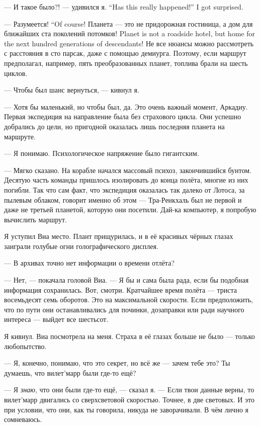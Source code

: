 {--- И такое было?! --- удивился я.}
{``Has this really happened!'' I got surprised.}

{--- Разумеется!}
{``Of course!}
{Планета --- это не придорожная гостиница, а дом для ближайших ста поколений потомков!}
{Planet is not a roadside hotel, but home for the next hundred generations of descendants!}
Не все нюансы можно рассмотреть с расстояния в сто парсак, даже с помощью демиурга.
Поэтому, если маршрут предполагал, например, пять преобразованных планет, топлива брали на шесть циклов.

--- Чтобы был шанс вернуться, --- кивнул я.

--- Хотя бы маленький, но чтобы был, да.
Это очень важный момент, Аркадиу.
Первая экспедиция на направление была без страхового цикла.
Они успешно добрались до цели, но пригодной оказалась лишь последняя планета на маршруте.

--- Я понимаю.
Психологическое напряжение было гигантским.

--- Мягко сказано.
На корабле начался массовый психоз, закончившийся бунтом.
Десятую часть команды пришлось изолировать до конца полёта, многие из них погибли.
Так что сам факт, что экспедиция оказалась так далеко от Лотоса, за пылевым облаком, говорит именно об этом --- Тра-Ренкхаль был не первой и даже не третьей планетой, которую они посетили.
Дай-ка компьютер, я попробую вычислить маршрут.

Я уступил Виа место.
Плант прищурилась, и в её красивых чёрных глазах заиграли голубые огни голографического дисплея.

--- В архивах точно нет информации о времени отлёта?

--- Нет, --- покачала головой Виа.
--- Я бы и сама была рада, если бы подобная информация сохранилась.
Вот, смотри.
Кратчайшее время полёта --- триста восемьдесят семь оборотов.
Это на максимальной скорости.
Если предположить, что по пути они останавливались для починки, дозаправки или ради научного интереса --- выйдет все шестьсот.

Я кивнул.
Виа посмотрела на меня.
Страха в её глазах больше не было --- только любопытство.

--- Я, конечно, понимаю, что это секрет, но всё же --- зачем тебе это?
Ты думаешь, что вилет'марр были где-то ещё?

--- Я \emph{знаю}, что они были где-то ещё, --- сказал я.
--- Если твои данные верны, то вилет'марр двигались со сверхсветовой скоростью.
Точнее, в две световых.
И это при условии, что они, как ты говорила, никуда не заворачивали.
В чём лично я сомневаюсь.

